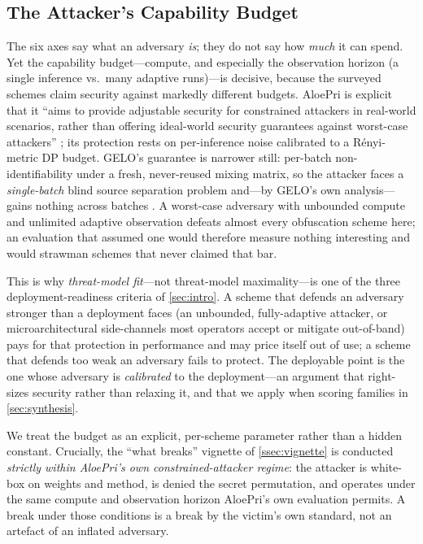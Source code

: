 
\subsection{The Attacker's Capability Budget}
\label{sec:threat-budget}

The six axes say what an adversary \emph{is}; they do not say how \emph{much}
it can spend. Yet the capability budget---compute, and especially the
observation horizon (a single inference vs.\ many adaptive runs)---is decisive,
because the surveyed schemes claim security against markedly different budgets.
AloePri is explicit that it ``aims to provide adjustable security for
constrained attackers in real-world scenarios, rather than offering ideal-world
security guarantees against worst-case attackers'' \citep{lin_aloepri}; its
protection rests on per-inference noise calibrated to a Rényi-metric DP budget.
GELO's guarantee is narrower still: per-batch non-identifiability under a fresh,
never-reused mixing matrix, so the attacker faces a \emph{single-batch} blind
source separation problem and---by GELO's own analysis---gains nothing across
batches \citep{belikov_gelo}. A worst-case adversary with unbounded compute and
unlimited adaptive observation defeats almost every obfuscation scheme here; an
evaluation that assumed one would therefore measure nothing interesting and
would strawman schemes that never claimed that bar.

This is why \emph{threat-model fit}---not threat-model maximality---is one of the three
deployment-readiness criteria of \cref{sec:intro}. A scheme that defends an adversary
stronger than a deployment faces (an unbounded, fully-adaptive attacker, or
microarchitectural side-channels most operators accept or mitigate out-of-band) pays for
that protection in performance and may price itself out of use; a scheme that defends
too weak an adversary fails to protect. The deployable point is the one whose adversary
is \emph{calibrated} to the deployment---an argument that right-sizes security rather
than relaxing it, and that we apply when scoring families in \cref{sec:synthesis}.

We treat the budget as an explicit, per-scheme parameter rather than a hidden
constant. Crucially, the ``what breaks'' vignette of \cref{ssec:vignette} is
conducted \emph{strictly within AloePri's own constrained-attacker regime}: the
attacker is white-box on weights and method, is denied the secret permutation,
and operates under the same compute and observation horizon AloePri's own
evaluation permits. A break under those conditions is a break by the victim's
own standard, not an artefact of an inflated adversary. 

